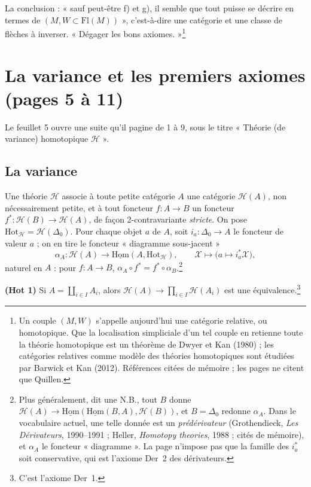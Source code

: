 \documentclass[11pt,a4paper]{article}
\begin{document}
La conclusion : « sauf peut-être f) et g), il semble que tout puisse se
décrire en termes de $(M, W \subset \mathrm{Fl}(M))$ », c'est-à-dire une catégorie et
une classe de flèches à inverser. « Dégager les bons axiomes. »\footnote{Un
couple $(M, W)$ s'appelle aujourd'hui une catégorie relative, ou
homotopique. Que la localisation simpliciale d'un tel couple en retienne
toute la théorie homotopique est un théorème de Dwyer et Kan (1980) ; les
catégories relatives comme modèle des théories homotopiques sont étudiées
par Barwick et Kan (2012). Références citées de mémoire ; les pages ne
citent que Quillen.}

\section*{La variance et les premiers axiomes (pages 5 à 11)}

Le feuillet 5 ouvre une suite qu'il pagine de 1 à 9, sous le titre
« Théorie (de variance) homotopique $\mathcal H$ ».

\subsection*{La variance}

Une théorie $\mathcal H$ associe à toute petite catégorie $A$ une catégorie
$\mathcal H(A)$, non nécessairement petite, et à tout foncteur $f : A \to B$
un foncteur $f^{*} : \mathcal H(B) \to \mathcal H(A)$, de façon
2-contravariante \emph{stricte}. On pose $\mathrm{Hot}_{\mathcal H} =
\mathcal H(\Delta_0)$. Pour chaque objet $a$ de $A$, soit $i_a : \Delta_0 \to
A$ le foncteur de valeur $a$ ; on en tire le foncteur « diagramme sous-jacent »
\[
  \alpha_A : \mathcal H(A) \longrightarrow \underline{\mathrm{Hom}}(A,
  \mathrm{Hot}_{\mathcal H}), \qquad \mathcal X \longmapsto \bigl(a \mapsto
  i_a^{*}\mathcal X\bigr),
\]
naturel en $A$ : pour $f : A \to B$, $\alpha_A \circ f^{*} = f^{*} \circ
\alpha_B$.\footnote{Plus généralement, dit une N.B., tout $B$ donne
$\mathcal H(A) \to \underline{\mathrm{Hom}}(\underline{\mathrm{Hom}}(B, A),
\mathcal H(B))$, et $B = \Delta_0$ redonne $\alpha_A$. Dans le vocabulaire
actuel, une telle donnée est un \emph{prédérivateur} (Grothendieck,
\emph{Les Dérivateurs}, 1990--1991 ; Heller, \emph{Homotopy theories}, 1988 ;
cités de mémoire), et $\alpha_A$ le foncteur « diagramme ». La page n'impose
pas que la famille des $i_a^{*}$ soit conservative, qui est l'axiome
Der~2 des dérivateurs.}

\textbf{(Hot 1)} Si $A = \coprod_{i \in I} A_i$, alors $\mathcal H(A)
\to \prod_{i \in I} \mathcal H(A_i)$ est une équivalence.\footnote{C'est
l'axiome Der~1.}
\end{document}
